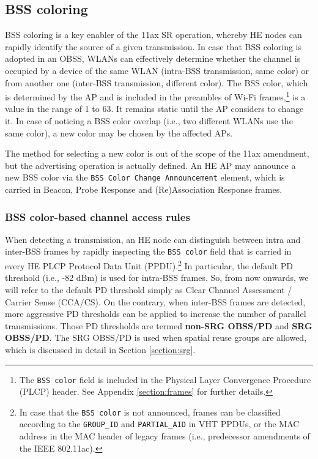 \documentclass[preprint,12pt]{elsarticle}
\begin{document}
	\subsection{BSS coloring}	
	\label{section:bss_coloring}	
	BSS coloring is a key enabler of the 11ax SR operation, whereby HE nodes can rapidly identify the source of a given transmission. In case that BSS coloring is adopted in an OBSS, WLANs can effectively determine whether the channel is occupied by a device of the same WLAN (intra-BSS transmission, same color) or from another one (inter-BSS transmission, different color). The BSS color, which is determined by the AP and is included in the preambles of Wi-Fi frames,\footnote{The \texttt{BSS color} field is included in the Physical Layer Convergence Procedure (PLCP) header. See Appendix \ref{section:frames} for further details.} is a value in the range of 1 to 63. It remains static until the AP considers to change it. In case of noticing a BSS color overlap (i.e., two different WLANs use the same color), a new color may be chosen by the affected APs. 
	
	The method for selecting a new color is out of the scope of the 11ax amendment, but the advertising operation is actually defined. An HE AP may announce a new BSS color via the \texttt{BSS Color Change Announcement} element, which is carried in Beacon, Probe Response and (Re)Association Response frames. 
	
	\subsubsection{BSS color-based channel access rules}
	\label{section:bss_color_channel_access}
	
	When detecting a transmission, an HE node can distinguish between intra and inter-BSS frames by rapidly inspecting the \texttt{BSS color} field that is carried in every HE PLCP Protocol Data Unit (PPDU).\footnote{In case that the \texttt{BSS color} is not announced, frames can be classified according to the \texttt{GROUP\_ID} and \texttt{PARTIAL\_AID} in VHT PPDUs, or the MAC address in the MAC header of legacy frames (i.e., predecessor amendments of the IEEE 802.11ac).} In particular, the default PD threshold (i.e., -82 dBm) is used for intra-BSS frames. So, from now onwards, we will refer to the default PD threshold simply as Clear Channel Assessment / Carrier Sense (CCA/CS). On the contrary, when inter-BSS frames are detected, more aggressive PD thresholds can be applied to increase the number of parallel transmissions. Those PD thresholds are termed \textbf{non-SRG OBSS/PD} and \textbf{SRG OBSS/PD}. The SRG OBSS/PD is used when spatial reuse groups are allowed, which is discussed in detail in Section \ref{section:srg}.
	
\end{document}
